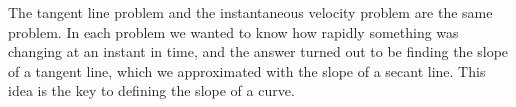 The tangent line problem and the instantaneous velocity problem are the same problem. In each problem we wanted to know how rapidly something was changing at an instant in time, and the answer turned out to be finding the slope of a tangent line, which we approximated with the slope of a secant line. This idea is the key to defining the slope of a curve.
